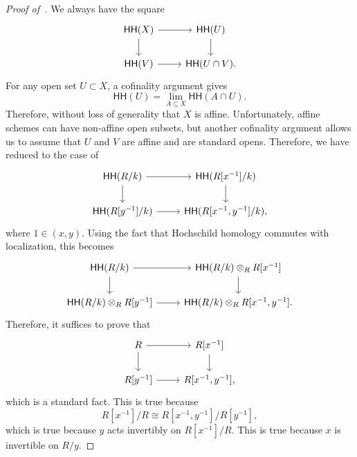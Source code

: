 \documentclass[10pt, oneside]{memoir}
\theoremstyle{definition}
\theoremstyle{remark}
\theoremstyle{plain}
\theoremstyle{definition}
\theoremstyle{remark}
\newcommand{\ms}[1]{\mathsf{#1}}
\newcommand{\1}{\mathbf{1}}
\newcommand{\2}{\mathbf{2}}
\newcommand{\3}{\mathbf{3}}
\newcommand{\HH}{\ms{HH}}
\begin{document}
\begin{proof}[Proof of~]
    We always have the square
    \begin{equation*}
        \begin{tikzcd}
            \HH(X) \ar{r} \ar{d} & \HH(U) \ar{d} \\
            \HH(V) \ar{r} & \HH(U \cap V).
        \end{tikzcd}
        \end{equation*}
        For any open set $U \subset X$, a cofinality argument gives
        \[ \HH(U) = \lim_{A \subseteq X} \HH(A \cap U). \]
        Therefore, without loss of generality that $X$ is affine. Unfortunately, affine schemes can have non-affine open subsets, but another cofinality argument allows us to assume that $U$ and $V$ are affine and are standard opens. Therefore, we have reduced to the case of
        \begin{equation*}
        \begin{tikzcd}
            \HH(R/k) \ar{r} \ar{d} & \HH(R[x^{-1}]/k) \ar{d} \\
            \HH(R[y^{-1}]/k) \ar{r} & \HH(R[x^{-1}, y^{-1}]/k),
        \end{tikzcd}
        \end{equation*}
        where $1 \in (x,y)$. Using the fact that Hochschild homology commutes with localization, this becomes
        \begin{equation*}
            \begin{tikzcd}
                \HH(R/k) \ar{r} \ar{d} & \HH(R/k) \otimes_R R[x^{-1}] \ar{d} \\
                \HH(R/k) \otimes_R R[y^{-1}] \ar{r} & \HH(R/k) \otimes_R R[x^{-1}, y^{-1}].
            \end{tikzcd}
        \end{equation*}
        Therefore, it suffices to prove that
        \begin{equation*}
        \begin{tikzcd}
            R \ar{r} \ar{d} & R[x^{-1}] \ar{d} \\
            R[y^{-1}] \ar{r} & R[x^{-1}, y^{-1}],
        \end{tikzcd}
        \end{equation*}
        which is a standard fact. This is true because
        \[ R[x^{-1}]/R \cong R[x^{-1}, y^{-1}]/ R[y^{-1}], \]
        which is true because $y$ acts invertibly on $R[x^{-1}]/R$. This is true because $x$ is invertible on $R/y$.
\end{proof}
\end{document}
